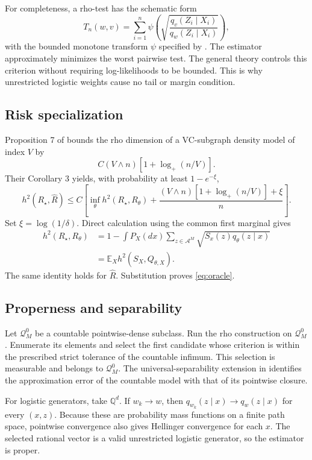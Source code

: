 \documentclass{article}
\theoremstyle{definition}
\theoremstyle{remark}
\newcommand{\E}{\mathbb E}
\newcommand{\cA}{\mathcal A}
\newcommand{\cQ}{\mathcal Q}
\begin{document}
For completeness, a rho-test has the schematic form \[ T_n(w,v)=\sum_{i=1}^n\psi\!\left(\sqrt{\frac{q_v(Z_i\mid X_i)}{q_w(Z_i\mid X_i)}}\right), \] with the bounded monotone transform $\psi$ specified by \citet{baraud2018rho}. The estimator approximately minimizes the worst pairwise test. The general theory controls this criterion without requiring log-likelihoods to be bounded. This is why unrestricted logistic weights cause no tail or margin condition.

\subsection{Risk specialization}

Proposition 7 of \citet{baraud2018rho} bounds the rho dimension of a VC-subgraph density model of index $V$ by \[ C(V\wedge n)[1+\log_+(n/V)]. \] Their Corollary 3 yields, with probability at least $1-e^{-\xi}$, \[ h^2(R_\star,\widehat R) \le C\left[\inf_{\theta}h^2(R_\star,R_\theta)+\frac{(V\wedge n)[1+\log_+(n/V)]+\xi}{n}\right]. \] Set $\xi=\log(1/\delta)$. Direct calculation using the common first marginal gives
\begin{align*}
h^2(R_\star,R_\theta)
&=1-\int P_X(dx)\sum_{z\in\cA^M}\sqrt{S_x(z)q_\theta(z\mid x)}\\
&=\E_Xh^2(S_X,Q_{\theta,X}).
\end{align*}
The same identity holds for $\widehat R$. Substitution proves \eqref{eq:oracle}.

\subsection{Properness and separability}

Let $\cQ_M^0$ be a countable pointwise-dense subclass. Run the rho construction on $\cQ_M^0$. Enumerate its elements and select the first candidate whose criterion is within the prescribed strict tolerance of the countable infimum. This selection is measurable and belongs to $\cQ_M^0$. The universal-separability extension in \citet{baraud2018rho} identifies the approximation error of the countable model with that of its pointwise closure.

For logistic generators, take $\mathbb Q^d$. If $w_k\to w$, then $q_{w_k}(z\mid x)\to q_w(z\mid x)$ for every $(x,z)$. Because these are probability mass functions on a finite path space, pointwise convergence also gives Hellinger convergence for each $x$. The selected rational vector is a valid unrestricted logistic generator, so the estimator is proper.
\end{document}
